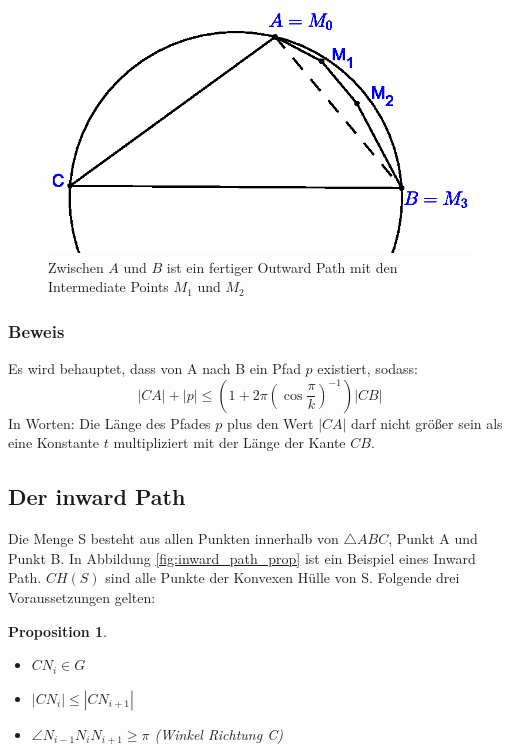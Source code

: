 \documentclass[a4paper,twoside]{IEEEtran}
\newtheorem{inwardPathProposition}{Proposition}
\begin{document}
\begin{figure}[h!]
\centering
\includegraphics[width=1\linewidth]{outward_path_fertig.eps}
\caption{Zwischen $A $ und $B $ ist ein fertiger Outward Path mit den Intermediate Points $M_1 $ und $M_2 $}
\label{fig:outward_path_fertig}
\end{figure}

\subsubsection{Beweis}
Es wird behauptet, dass von A nach B ein Pfad $p $ existiert, sodass:
\begin{equation}
|CA| + |p| \leq (1+2\pi(\cos{\frac{\pi}{k}})^{-1})|CB|
\end{equation}
In Worten: Die Länge des Pfades $p $ plus den Wert $|CA| $ darf nicht größer sein als eine Konstante $t $ multipliziert mit der Länge der Kante $CB $.







\subsection{Der inward Path}
Die Menge S besteht aus allen Punkten innerhalb von $\triangle {ABC} $, Punkt A und Punkt B.
In Abbildung \ref{fig:inward_path_prop} ist ein Beispiel eines Inward Path.
$CH(S) $ sind alle Punkte der Konvexen Hülle von S. %
Folgende drei Voraussetzungen gelten:
\begin{inwardPathProposition}
\begin{itemize} %
	\item $CN_i \in G$
	\item $|CN_i| \leq |CN_{i+1}| $
	\item $\angle{N_{i-1}N_iN_{i+1}} \geq \pi $ (Winkel Richtung C)
\end{itemize} 
\end{inwardPathProposition}
\end{document}
